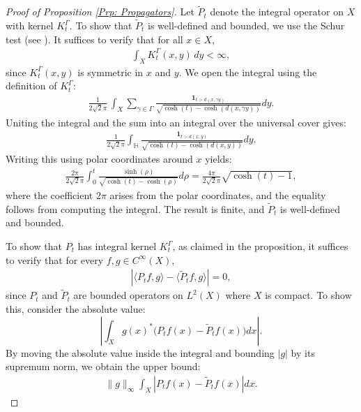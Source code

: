\documentclass[11pt,twoside,reqno]{amsart} \usepackage{a4wide} \usepackage[T1]{fontenc} \usepackage[utf8]{inputenc} \usepackage{soul}  \usepackage{amsmath} \usepackage{amsfonts} \usepackage{amssymb} \usepackage{mathtools} \usepackage{amsthm} \usepackage{xcolor} \usepackage{graphicx} \usepackage{hyperref} \usepackage{standalone} \usepackage{esint} \usepackage{comment} \usepackage[left=2.3cm,top=3cm,right=2.3cm]{geometry} \usepackage{bm} \usepackage{svg} \usepackage{float} \numberwithin{equation}{section} \theoremstyle{plain} \newtheorem{thm}{Theorem}[section] \newtheorem{theorem}[thm]{Theorem} \newtheorem*{theorem*}{Theorem}\newtheorem{conj}[thm]{Conjecture} \newtheorem{lemma}[thm]{Lemma} \newtheorem{prop}[thm]{Proposition} \newtheorem{proposition}[thm]{Proposition} \newtheorem{cor}[thm]{Corollary} \newtheorem{question}[thm]{Question} \newtheorem{corollary}[thm]{Corollary} \newtheorem{assumption}[thm]{Assumption} \theoremstyle{definition} \newtheorem{defn}[thm]{Definition} \newtheorem{choice}[thm]{Choice} \newtheorem{definition}[thm]{Definition} \newtheorem{ex}[thm]{Example} \newtheorem{notation}[thm]{Notation} \newtheorem*{ack}{Acknowledgements} \theoremstyle{remark} \newtheorem{remark}[thm]{Remark} \newtheorem{bigremark}[thm]{Remark} \usepackage{xcolor} \newcommand{\red}[1]{ {\color{Red}#1} } \newcommand{\blue}[1]{ {\color{Blue}#1} } \author{Kai Hippi} \address{Aalto University, Espoo, Finland} \email{kai.hippi@aalto.fi}
\begin{document}
\begin{proof}[Proof of Proposition \ref{Prp: Propagators}]
Let $\tilde{P}_t$ denote the integral operator on $X$ with kernel $K_t^\Gamma$. To show that $\tilde{P}_{t}$ is well-defined and bounded, we use the Schur test (see \cite{HS12}). It suffices to verify that for all $x \in X$,
\begin{align*}
	\int_{X} K_{t}^{\Gamma}(x,y) \, dy < \infty,
\end{align*}
since $K_{t}^{\Gamma}(x,y)$ is symmetric in $x$ and $y$. We open the integral using the definition of $K_{t}^{\Gamma}$:
\begin{align*}
	\frac{1}{2 \sqrt{2} \pi } \, \int_{X} \sum_{\gamma \in \Gamma} \frac{ \mathbf{1}_{t > d(x, \gamma y)} }{ \sqrt{ \cosh(t) - \cosh(d(x, \gamma y)) } } dy.
\end{align*}
Uniting the integral and the sum into an integral over the universal cover gives:
\begin{align*}
	\frac{1}{2 \sqrt{2} \pi} \int_{\mathbb{H}} \frac{ \mathbf{1}_{t > d(x, y)} }{ \sqrt{ \cosh(t) - \cosh(d(x,y)) } } dy.
\end{align*}
Writing this using polar coordinates around $x$ yields:
\begin{align*}
	\frac{2\pi}{2 \sqrt{2} \pi} \int_{0}^{t} \frac{\sinh(\rho)}{\sqrt{\cosh(t) - \cosh(\rho)}} d\rho = \frac{4\pi}{2 \sqrt{2} \pi} \sqrt{\cosh(t) - 1},
\end{align*}
where the coefficient $2\pi$ arises from the polar coordinates, and the equality follows from computing the integral. The result is finite, and $\tilde{P}_{t}$ is well-defined and bounded.

To show that $P_{t}$ has integral kernel $K_{t}^{\Gamma}$, as claimed in the proposition, it suffices to verify that for every $f, g \in C^{\infty}(X)$,
\begin{align*}
	\left| \langle P_{t} f, g \rangle - \langle \tilde{P}_{t} f, g \rangle \right| = 0,
\end{align*}
since $P_{t}$ and $\tilde{P}_{t}$ are bounded operators on $L^{2}(X)$ where $X$ is compact. To show this, consider the absolute value:
\[
\left| \int_X g(x)^* \big( P_t f(x) - \tilde{P}_t f(x) \big) dx \right|.
\]
By moving the absolute value inside the integral and bounding \( |g| \) by its supremum norm, we obtain the upper bound:
\begin{align*}
	\| g \|_{\infty} \int_{X} \left| P_{t} f(x) - \tilde{P}_{t} f(x) \right| dx.
\end{align*}


\end{proof}
\end{document}
